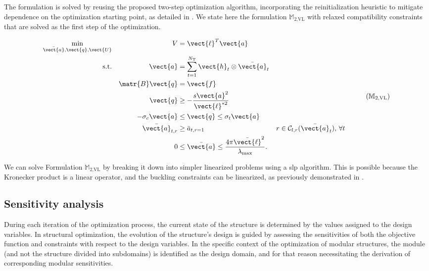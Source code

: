 The formulation is solved by reusing the proposed two-step optimization algorithm, incorporating the reinitialization heuristic to mitigate dependence on the optimization starting point, as detailed in . We state here the formulation $\mathbb{M}_\text{2,VL}$ with relaxed compatibility constraints that are solved as the first step of the optimization. 

\begin{equation}
    \begin{aligned}
    \min_{\bar{\vect{a}}, \vect{q}, \vect{U}}   && V &= \vect{\ell}^{T}\vect{a}\\
    \textrm{s.t.}  && \vect{a} &= \sum_{t=1}^{N_\text{T}} \vect{h}_t\otimes\bar{\vect{a}}_t \\ 
    && \matr{B}\vect{q} &= \vect{f} && \\
    && \vect{q} &\geq -\frac{s\vect{a}^2}{\vect{\ell}^{*2}} &&  \\
    && -\sigma_c\vect{a} &\leq \vect{q} \leq \sigma_t\vect{a} &&  \\
    && \bar{\vect{a}}_{t,r}&\geq \bar{a}_{t,r=1} && r \in \mathcal{C}_{l,r}(\bar{\vect{a}}_t),\, \forall t \\
    && 0 &\leq \bar{\vect{a}} \leq \frac{4 \pi \bar{\vect{\ell}}^2}{\lambda_{\text{max}}}. \\
    \end{aligned}
    \tag{${\mathbb{M}}_\text{2,VL}$}
    \label{eq:05_optim_no_constr_modular}
\end{equation}

We can solve Formulation $\mathbb{M}_\text{2,VL}$ by breaking it down into simpler linearized problems using a \gls{slp} algorithm. This is possible because the Kronecker product is a linear operator, and the buckling constraints can be linearized, as previously demonstrated in .

\subsection{Sensitivity analysis}
During each iteration of the optimization process, the current state of the structure is determined by the values assigned to the design variables. In structural optimization, the evolution of the structure's design is guided by assessing the sensitivities of both the objective function and constraints with respect to the design variables. In the specific context of the optimization of modular structures, the module (and not the structure divided into subdomains) is identified as the design domain, and for that reason necessitating the derivation of corresponding modular sensitivities.

